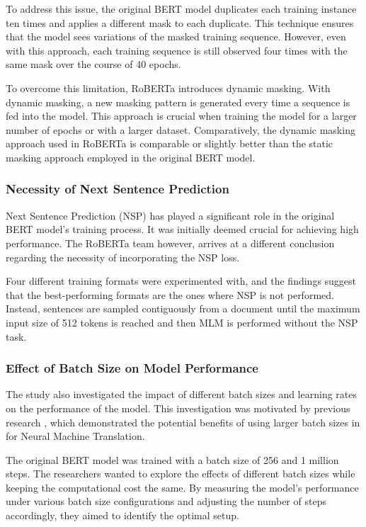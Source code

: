 \documentclass[a4paper,10pt]{report} %
\begin{document}
To address this issue, the original BERT model duplicates each training instance ten times and applies a different mask to each duplicate. This technique ensures that the model sees variations of the masked training sequence. However, even with this approach, each training sequence is still observed four times with the same mask over the course of 40 epochs.

To overcome this limitation, RoBERTa introduces dynamic masking. With dynamic masking, a new masking pattern is generated every time a sequence is fed into the model. This approach is crucial when training the model for a larger number of epochs or with a larger dataset. Comparatively, the dynamic masking approach used in RoBERTa is comparable or slightly better than the static masking approach employed in the original BERT model. \cite{roberta}

\subsubsection{Necessity of Next Sentence Prediction}
Next Sentence Prediction (NSP) has played a significant role in the original BERT model's training process. It was initially deemed crucial for achieving high performance. The RoBERTa team however, arrives at a different conclusion regarding the necessity of incorporating the NSP loss.

Four different training formats were experimented with, and the findings suggest that the best-performing formats are the ones where NSP is not performed. Instead, sentences are sampled contiguously from a document until the maximum input size of 512 tokens is reached and then MLM is performed without the NSP task. \cite{roberta}

\subsubsection{Effect of Batch Size on Model Performance}
The study also investigated the impact of different batch sizes and learning rates on the performance of the model. This investigation was motivated by previous research \cite{OttScaling}, which demonstrated the potential benefits of using larger batch sizes in for Neural Machine Translation.

The original BERT model was trained with a batch size of 256 and 1 million steps. The researchers wanted to explore the effects of different batch sizes while keeping the computational cost the same. By measuring the model's performance under various batch size configurations and adjusting the number of steps accordingly, they aimed to identify the optimal setup.
\end{document}

